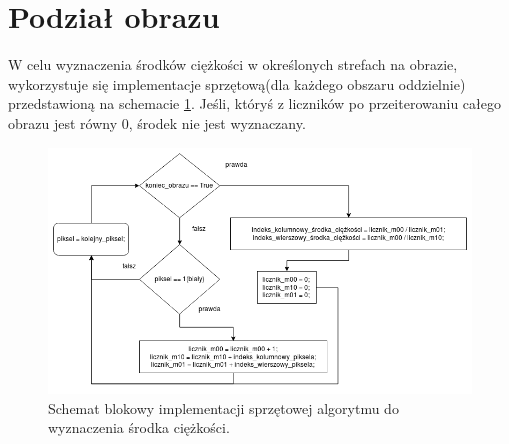 \section{Podział obrazu}

W celu wyznaczenia środków ciężkości w określonych strefach na obrazie, wykorzystuje się implementacje sprzętową(dla każdego obszaru oddzielnie) przedstawioną na schemacie \ref{fig:wyzn_sc}. Jeśli, któryś z liczników po przeiterowaniu całego obrazu jest równy 0, środek nie jest wyznaczany.
\begin{figure}[h]
	\centering
	\includegraphics[scale=0.6]{wyzn_sc.png}
	\caption{Schemat blokowy implementacji sprzętowej algorytmu do wyznaczenia środka ciężkości.}
	\label{fig:wyzn_sc}
\end{figure}